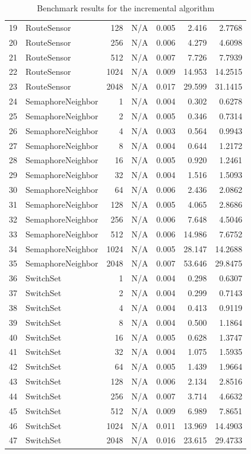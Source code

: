 \begin{table}[H]
\begin{tabular}{rlrrrrr}
		19 & RouteSensor & 128 & N/A & 0.005 & 2.416 & 2.7768 \\ 
		20 & RouteSensor & 256 & N/A & 0.006 & 4.279 & 4.6098 \\ 
		21 & RouteSensor & 512 & N/A & 0.007 & 7.726 & 7.7939 \\ 
		22 & RouteSensor & 1024 &N/A  & 0.009 & 14.953 & 14.2515 \\ 
		23 & RouteSensor & 2048 &N/A  & 0.017 & 29.599 & 31.1415 \\ 
		\hline
		24 & SemaphoreNeighbor & 1 &  N/A& 0.004 & 0.302 & 0.6278 \\ 
		25 & SemaphoreNeighbor & 2 &  N/A& 0.005 & 0.346 & 0.7314 \\ 
		26 & SemaphoreNeighbor & 4 &  N/A& 0.003 & 0.564 & 0.9943 \\ 
		27 & SemaphoreNeighbor & 8 &  N/A& 0.004 & 0.644 & 1.2172 \\ 
		28 & SemaphoreNeighbor & 16 & N/A & 0.005 & 0.920 & 1.2461 \\ 
		29 & SemaphoreNeighbor & 32 & N/A & 0.004 & 1.516 & 1.5093 \\ 
		30 & SemaphoreNeighbor & 64 & N/A & 0.006 & 2.436 & 2.0862 \\ 
		31 & SemaphoreNeighbor & 128 &N/A  & 0.005 & 4.065 & 2.8686 \\ 
		32 & SemaphoreNeighbor & 256 &N/A  & 0.006 & 7.648 & 4.5046 \\ 
		33 & SemaphoreNeighbor & 512 &N/A  & 0.006 & 14.986 & 7.6752 \\ 
		34 & SemaphoreNeighbor & 1024 & N/A & 0.005 & 28.147 & 14.2688 \\ 
		35 & SemaphoreNeighbor & 2048 & N/A & 0.007 & 53.646 & 29.8475 \\ 
		\hline
		36 & SwitchSet & 1 & N/A & 0.004 & 0.298 & 0.6307 \\ 
		37 & SwitchSet & 2 & N/A & 0.004 & 0.299 & 0.7143 \\ 
		38 & SwitchSet & 4 & N/A & 0.004 & 0.413 & 0.9119 \\ 
		39 & SwitchSet & 8 & N/A & 0.004 & 0.500 & 1.1864 \\ 
		40 & SwitchSet & 16 &N/A  & 0.005 & 0.628 & 1.3747 \\ 
		41 & SwitchSet & 32 &N/A  & 0.004 & 1.075 & 1.5935 \\ 
		42 & SwitchSet & 64 &N/A  & 0.005 & 1.439 & 1.9664 \\ 
		43 & SwitchSet & 128 & N/A & 0.006 & 2.134 & 2.8516 \\ 
		44 & SwitchSet & 256 & N/A & 0.007 & 3.714 & 4.6632 \\ 
		45 & SwitchSet & 512 & N/A & 0.009 & 6.989 & 7.8651 \\ 
		46 & SwitchSet & 1024 &N/A  & 0.011 & 13.969 & 14.4903 \\ 
		47 & SwitchSet & 2048 &N/A  & 0.016 & 23.615 & 29.4733 \\ 
		\hline
	\end{tabular}
	\caption{Benchmark results for the incremental algorithm}
	\label{tab:tb-inc}
\end{table}



